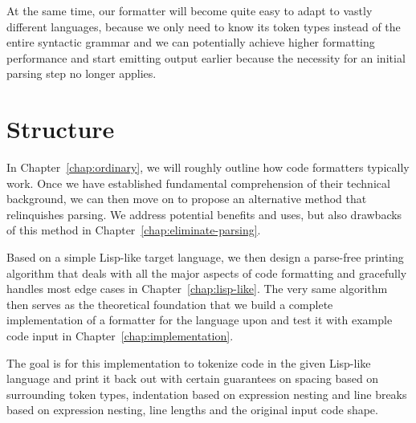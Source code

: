 At the same time, our formatter will become quite easy to adapt to vastly different languages,
because we only need to know its token types instead of the entire syntactic grammar and
we can potentially achieve higher formatting performance and start emitting output earlier
because the necessity for an initial parsing step no longer applies.

\section{Structure}
In Chapter~\ref{chap:ordinary}, we will roughly outline how code formatters typically work.
Once we have established fundamental comprehension of their technical background,
we can then move on to propose an alternative method that relinquishes parsing.
We address potential benefits and uses,
but also drawbacks of this method in Chapter~\ref{chap:eliminate-parsing}.

Based on a simple Lisp-like target language,
we then design a parse-free printing algorithm
that deals with all the major aspects of code formatting
and gracefully handles most edge cases
in Chapter~\ref{chap:lisp-like}.
The very same algorithm then serves as the theoretical foundation
that we build a complete implementation of a formatter
for the language upon and test it with example code input
in Chapter~\ref{chap:implementation}.

The goal is for this implementation to tokenize code in the given Lisp-like language
and print it back out with certain guarantees on
spacing based on surrounding token types,
indentation based on expression nesting and
line breaks based on expression nesting, line lengths and the original input code shape.
